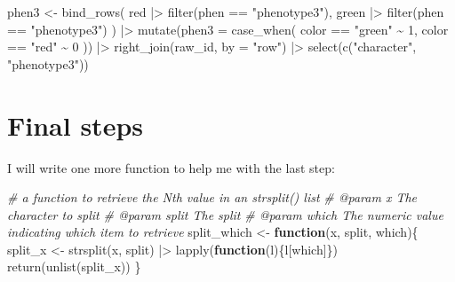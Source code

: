 \documentclass[
]{book}
\newenvironment{Shaded}{\begin{snugshade}}{\end{snugshade}}
\newcommand{\AttributeTok}[1]{\textcolor[rgb]{0.77,0.63,0.00}{#1}}
\newcommand{\CommentTok}[1]{\textcolor[rgb]{0.56,0.35,0.01}{\textit{#1}}}
\newcommand{\ControlFlowTok}[1]{\textcolor[rgb]{0.13,0.29,0.53}{\textbf{#1}}}
\newcommand{\DecValTok}[1]{\textcolor[rgb]{0.00,0.00,0.81}{#1}}
\newcommand{\FunctionTok}[1]{\textcolor[rgb]{0.00,0.00,0.00}{#1}}
\newcommand{\NormalTok}[1]{#1}
\newcommand{\OtherTok}[1]{\textcolor[rgb]{0.56,0.35,0.01}{#1}}
\newcommand{\SpecialCharTok}[1]{\textcolor[rgb]{0.00,0.00,0.00}{#1}}
\newcommand{\StringTok}[1]{\textcolor[rgb]{0.31,0.60,0.02}{#1}}
\begin{document}
\begin{Shaded}
\begin{Highlighting}[]
\NormalTok{phen3 }\OtherTok{\textless{}{-}} \FunctionTok{bind\_rows}\NormalTok{(}
\NormalTok{  red }\SpecialCharTok{|\textgreater{}} \FunctionTok{filter}\NormalTok{(phen }\SpecialCharTok{==} \StringTok{"phenotype3"}\NormalTok{),}
\NormalTok{  green }\SpecialCharTok{|\textgreater{}} \FunctionTok{filter}\NormalTok{(phen }\SpecialCharTok{==} \StringTok{"phenotype3"}\NormalTok{)}
\NormalTok{) }\SpecialCharTok{|\textgreater{}} 
  \FunctionTok{mutate}\NormalTok{(}\AttributeTok{phen3 =} \FunctionTok{case\_when}\NormalTok{(}
\NormalTok{    color }\SpecialCharTok{==} \StringTok{"green"} \SpecialCharTok{\textasciitilde{}} \DecValTok{1}\NormalTok{,}
\NormalTok{    color }\SpecialCharTok{==} \StringTok{"red"} \SpecialCharTok{\textasciitilde{}} \DecValTok{0}
\NormalTok{  )) }\SpecialCharTok{|\textgreater{}} 
  \FunctionTok{right\_join}\NormalTok{(raw\_id, }\AttributeTok{by =} \StringTok{"row"}\NormalTok{) }\SpecialCharTok{|\textgreater{}} 
  \FunctionTok{select}\NormalTok{(}\FunctionTok{c}\NormalTok{(}\StringTok{"character"}\NormalTok{, }\StringTok{"phenotype3"}\NormalTok{))}
\end{Highlighting}
\end{Shaded}

\hypertarget{final-steps}{%
\section{Final steps}\label{final-steps}}

I will write one more function to help me with the last step:

\begin{Shaded}
\begin{Highlighting}[]
\CommentTok{\#\textquotesingle{} a function to retrieve the Nth value in an strsplit() list }
\CommentTok{\#\textquotesingle{} @param x The character to split }
\CommentTok{\#\textquotesingle{} @param split The split }
\CommentTok{\#\textquotesingle{} @param which The numeric value indicating which item to retrieve}
\NormalTok{split\_which }\OtherTok{\textless{}{-}} \ControlFlowTok{function}\NormalTok{(x, split, which)\{}
\NormalTok{  split\_x }\OtherTok{\textless{}{-}} \FunctionTok{strsplit}\NormalTok{(x, split) }\SpecialCharTok{|\textgreater{}} \FunctionTok{lapply}\NormalTok{(}\ControlFlowTok{function}\NormalTok{(l)\{l[which]\})}
  \FunctionTok{return}\NormalTok{(}\FunctionTok{unlist}\NormalTok{(split\_x))}
\NormalTok{\}}
\end{Highlighting}
\end{Shaded}
\end{document}
